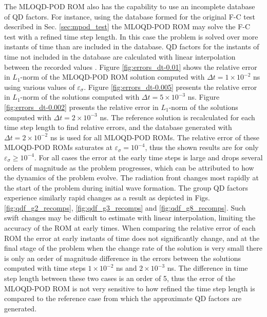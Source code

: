	\ind The MLOQD-POD ROM also has the capability to use an incomplete database of QD factors. For instance, using the database formed for the original F-C test described in Sec. \ref{sec:mpod_test} the MLOQD-POD ROM may solve the F-C test with a refined time step length. In this case the problem is solved over more instants of time than are included in the database. QD factors for the instants of time not included in the database are calculated with linear interpolation between the recorded values \cite{Bui-Thanh-2003}. Figure \ref{fig:errors_dt-0.01} shows the  relative error in $L_1$-norm of the MLOQD-POD ROM solution computed with $\Delta t \! = \! 1\! \times\! 10^{-2}$ ns using various values of $\varepsilon_{\sigma}$. Figure \ref{fig:errors_dt-0.005}  presents the relative error in $L_1$-norm of the solutions computed with $\Delta t \! = \! 5\! \times  \! 10^{-3}$ ns. Figure \ref{fig:errors_dt-0.002}  presents the relative error in $L_1$-norm of the solutions computed with $\Delta t \! = \! 2\! \times  \! 10^{-3}$ ns. The reference solution is recalculated for each time step length to find relative errors, and the database generated with $\Delta t = 2\times 10^{-2}$ ns is used for all MLOQD-POD ROMs. The relative error of these MLOQD-POD ROMs saturates at $\varepsilon_\sigma=10^{-4}$, thus the shown results are for only $\varepsilon_\sigma \geq 10^{-4}$. For all cases the error at the early time steps is large and drops several orders of magnitude as the problem progresses, which can be attributed to how the dynamics of the problem evolve. The radiation front changes most rapidly at the start of the problem during initial wave formation. The group QD factors experience similarly rapid changes as a result as depicted in Figs. \ref{fig:qdf_g2_recomps}, \ref{fig:qdf_g3_recomps} and \ref{fig:qdf_g8_recomps}. Such swift changes may be difficult to estimate with linear interpolation, limiting the accuracy of the ROM at early times. When comparing the relative error of each ROM the error at early instants of time does not significantly change, and at the final stage of the problem when the change rate of the solution is very small there is only an order of magnitude difference in the errors between the solutions computed with time steps $1\times10^{-2}$ ns and $2\times10^{-3}$ ns. The difference in time step length between these two cases is an order of 5, thus the error of the MLOQD-POD ROM is not very sensitive to how refined the time step length is compared to the reference case from which the approximate QD factors are generated.

